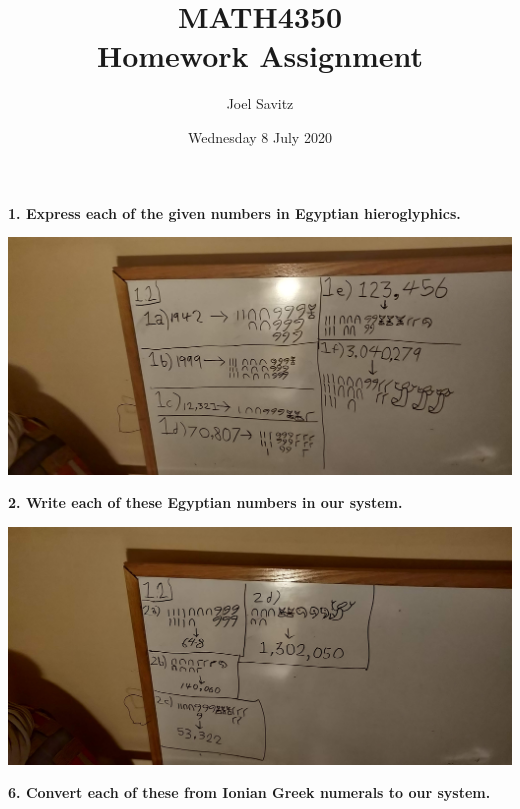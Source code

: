\documentclass[12pt]{article}
\title{MATH4350 \\ Homework Assignment}
\author{Joel Savitz}
\date{Wednesday 8 July 2020}
\begin{document}
\maketitle

\textbf{1. Express each of the given numbers in Egyptian hieroglyphics.}
\medskip

\includegraphics[scale=0.08]{1.jpg}

\pagebreak
\textbf{2. Write each of these Egyptian numbers in our system.}
\medskip

\includegraphics[scale=0.08]{2.jpg}

\pagebreak
\textbf{6. Convert each of these from Ionian Greek numerals to our system.}
\medskip
\end{document}
